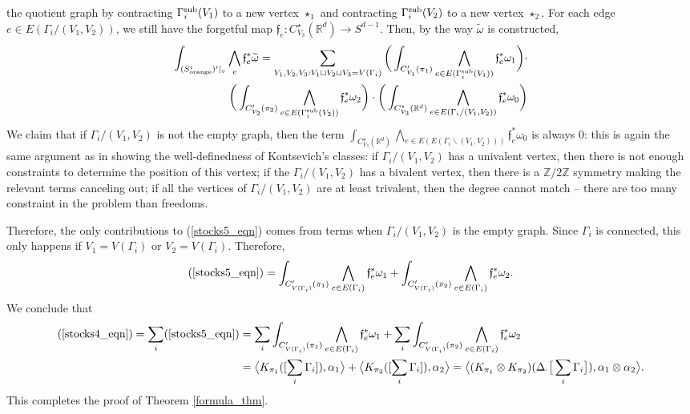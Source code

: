 \documentclass[11pt]{article}
\theoremstyle{definition}
\theoremstyle{remark}
\def\wt#1{\widetilde{#1}}
\def\sorange{{\textnormal{orange}}}
\def\Z{\mathbb{Z}}
\def\R{\mathbb{R}}
\def\ff{\mathfrak{f}}
\def\tn#1{\textnormal{#1}}
\begin{document}
the quotient graph by contracting $\Gamma^{\tn{sub}}_i(V_1)$ to a new vertex $\star_1$ and contracting $\Gamma^{\tn{sub}}_i(V_2)$ to a new vertex $\star_2$. 
For each edge $e\in E(\Gamma_i/(V_1,V_2))$, we still have the forgetful map $\ff_e:C^\star_{V_3}(\R^d)\to S^{d-1}$. 
Then, by the way $\wt\omega$ is constructed, 
\begin{align}\label{stocks5_eqn}
\int_{({S}_{\sorange}^i)'|_v}\bigwedge_e\ff_e^*\wt\omega=
\sum_{V_1,V_2,V_3:V_1\sqcup V_2\sqcup V_3=V(\Gamma_i)}
\bigg(\int_{C'_{V_1}(\pi_1)}\bigwedge_{e\in E(\Gamma^{\tn{sub}}_i(V_1))}\ff_e^*\omega_1\bigg)\cdot \nonumber\\
\bigg(\int_{C'_{V_2}(\pi_2)}\bigwedge_{e\in E(\Gamma^{\tn{sub}}_i(V_2))}\ff_e^*\omega_2\bigg)
\cdot
\bigg(\int_{C^\star_{V_3}(\R^d)}\bigwedge_{e\in E(\Gamma_i/(V_1,V_2))}\ff_e^*\omega_0\bigg)
\end{align}
We claim that if $\Gamma_i/(V_1,V_2)$ is not the empty graph, then the term $\int_{C^\star_{V_3}(\R^d)}\bigwedge_{e\in E(E(\Gamma_i\backslash(V_1,V_2)))}\ff_e^*\omega_0$ is always 0:
this is again the same argument as in showing the well-definedness of Kontsevich's classes: if $\Gamma_i/(V_1,V_2)$ has a univalent vertex, then there is not enough constraints to determine the position of this vertex; if the $\Gamma_i/(V_1,V_2)$ has a bivalent vertex, then there is a $\Z/2\Z$ symmetry making the relevant terms canceling out; if all the vertices of $\Gamma_i/(V_1,V_2)$ are at least trivalent, then the degree cannot match -- there are too many constraint in the problem than freedoms. 

Therefore, the only contributions to (\ref{stocks5_eqn}) comes from terms when $\Gamma_i/(V_1,V_2)$ is the empty graph. Since $\Gamma_i$ is connected, this only happens if $V_1=V(\Gamma_i)$ or $V_2=V(\Gamma_i)$. Therefore, 
$$(\ref{stocks5_eqn})=
\int_{C'_{V(\Gamma_i)}(\pi_1)}\bigwedge_{e\in E(\Gamma_i)}\ff_e^*\omega_1+
\int_{C'_{V(\Gamma_i)}(\pi_2)}\bigwedge_{e\in E(\Gamma_i)}\ff_e^*\omega_2.$$
We conclude that 
\begin{align*}
(\ref{stocks4_eqn})=\sum_i(\ref{stocks5_eqn})&
=\sum_i\int_{C'_{V(\Gamma_i)}(\pi_1)}\bigwedge_{e\in E(\Gamma_i)}\ff_e^*\omega_1+ \sum_i\int_{C'_{V(\Gamma_i)}(\pi_2)}\bigwedge_{e\in E(\Gamma_i)}\ff_e^*\omega_2\\
&=\big\langle K_{\pi_1}([\sum_i\Gamma_i]),\alpha_1\big\rangle
+\big\langle K_{\pi_2}([\sum_i\Gamma_i]),\alpha_2\big\rangle
=\big\langle (K_{\pi_1}\otimes K_{\pi_2})(\Delta_{\cdot}\big[\sum_{i}\Gamma_i\big]), \alpha_1\otimes\alpha_2 \big\rangle. 
\end{align*}
This completes the proof of Theorem \ref{formula_thm}. 
\end{document}
